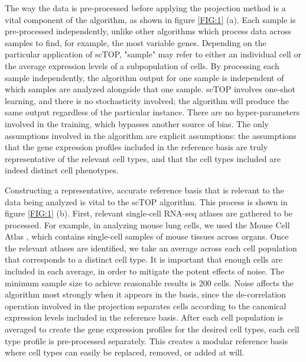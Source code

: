 \documentclass[aps,superscriptaddress, notitlepage,longbibliography]{revtex4-1}
\begin{document}
The way the data is pre-processed before applying the projection method is a vital component of the algorithm, as shown in figure \ref{FIG:1} (a). Each sample is pre-processed independently, unlike other algorithms which process data across samples to find, for example, the most variable genes. Depending on the particular application of scTOP, "sample" may refer to either an individual cell or the average expression levels of a subpopulation of cells. By processing each sample independently, the algorithm output for one sample is independent of which samples are analyzed alongside that one sample. scTOP involves one-shot learning, and there is no stochasticity involved; the algorithm will produce the same output regardless of the particular instance. There are no hyper-parameters involved in the training, which bypasses another source of bias. The only assumptions involved in the algorithm are explicit assumptions: the assumptions that the gene expression profiles included in the reference basis are truly representative of the relevant cell types, and that the cell types included are indeed distinct cell phenotypes.

Constructing a representative, accurate reference basis that is relevant to the data being analyzed is vital to the scTOP algorithm. This process is shown in figure \ref{FIG:1} (b). First, relevant single-cell RNA-seq atlases are gathered to be processed. For example, in analyzing mouse lung cells, we used the Mouse Cell Atlas , which contains single-cell samples of mouse tissues across  organs. Once the relevant atlases are identified, we take an average across each cell population that corresponds to a distinct cell type. It is important that enough cells are included in each average, in order to mitigate the potent effects of noise. The minimum sample size to achieve reasonable results is 200 cells. Noise affects the algorithm most strongly when it appears in the basis, since the de-correlation operation involved in the projection separates cells according to the canonical expression levels included in the reference basis.  After each cell population is averaged to create the gene expression profiles for the desired cell types, each cell type profile is pre-processed separately. This creates a modular reference basis where cell types can easily be replaced, removed, or added at will. 
\end{document}
